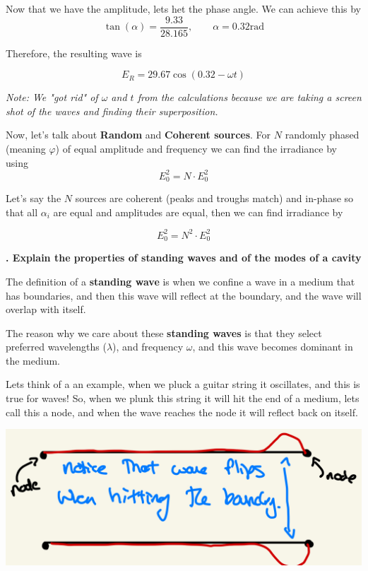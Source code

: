 \documentclass[10pt]{article}
\newcounter{counter}
\newcommand*{\question}[1]{
            \textbf{\thecounter. #1} \hfill
            \addtocounter{counter}{1}
            
            \newblock

            }
\begin{document}
Now that we have the amplitude, lets het the phase angle. We can achieve this by 
\[\tan(\alpha) = \frac{9.33}{28.165},\qquad \alpha = 0.32\text{rad}\]

Therefore, the resulting wave is 

\[\boxed{E_R = 29.67 \cos(0.32 - \omega t)} \]

\textit{Note: We "got rid" of $\omega$ and $t$ from the calculations because we are taking a screen shot of the waves and finding their superposition.}

\newblock

Now, let's talk about \textbf{Random} and \textbf{Coherent sources}. For $N$ randomly phased (meaning $\varphi$) of equal amplitude and frequency we can find the irradiance by using 
\[E_0^2 = N\cdot E_0^2\]

Let's say the $N$ sources are coherent (peaks and troughs match) and in-phase so that all $\alpha_i$ are equal and amplitudes are equal, then we can find irradiance by 

\[E_0^2 = N^2 \cdot E_0^2\]

\newblock

\question{Explain the properties of standing waves and of the modes of a cavity}

The definition of a \textbf{standing wave} is when we confine a wave in a medium that has boundaries, and then this wave will reflect at the boundary, and the wave will overlap with itself. 

\newblock

The reason why we care about these \textbf{standing waves} is that they select preferred wavelengths ($\lambda$), and frequency $\omega$, and this wave becomes dominant in the medium. 

\newblock

Lets think of a an example, when we pluck a guitar string it oscillates, and this is true for waves! So, when we plunk this string it will hit the end of a medium, lets call this a node, and when the wave reaches the node it will reflect back on itself.

\begin{center}
    \includegraphics*[scale = .2]{imgs/standing-wave-diagram.jpeg}
\end{center}
\end{document}

